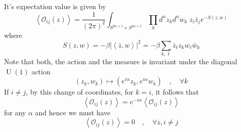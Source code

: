 \documentclass[a4paper,11pt]{article}
\theoremstyle{definition}
\DeclareMathOperator{\U}{U}
\newcommand{\OO}{\mathcal O}
\begin{document}
It's expectation value is given by
\begin{equation}
  \left\langle \OO_{ij}(z) \right\rangle = \frac{1}{(2\pi)^2} \int_{S^{2n+1}\times S^{2n+1}} \prod_k d^nz_k d^nw_k\; z_i \bar z_j e^{- S(z,w)}  
\end{equation}
where 
\begin{equation}
  S(z,w) = - \beta \lvert \left\langle \bar z, w \right\rangle \rvert^2 = - \beta \sum_{k,\ell} \bar z_{\ell} z_k w_{\ell} \bar w_{k} 
\end{equation}
Note that both, the action and the measure is invariant under the diagonal $\U(1)$ action 
\begin{equation}
  (z_k,w_k) \mapsto (e^{i\alpha}z_k, e^{i\alpha}w_k) \quad , \quad \forall k
\end{equation}
If $i \neq j$, by this change of coordinates, for $k=i$, it follows that
\begin{equation}
  \left\langle \OO_{ij}(z) \right\rangle = e^{-i\alpha}\left\langle \OO_{ij}(z) \right\rangle
\end{equation}
for any $\alpha$ and hence we must have
\begin{equation}
  \boxed{
    \left\langle \OO_{ij}(z) \right\rangle = 0 \quad , \quad \forall z, i \neq j 
  }
  \label{eq:toy_one_pt}
\end{equation}
\end{document}
